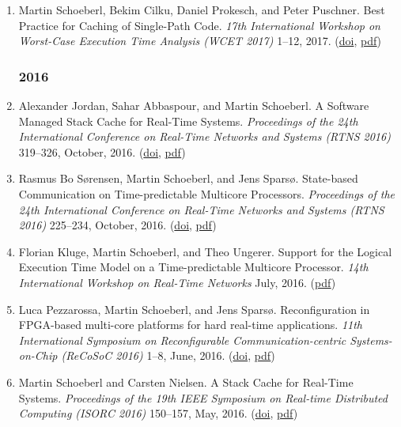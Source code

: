 \begin{enumerate}
\item Martin Schoeberl, Bekim Cilku, Daniel Prokesch, and Peter Puschner.
 Best Practice for Caching of Single-Path Code.
 \emph{17th International Workshop on Worst-Case Execution Time Analysis (WCET 2017)} 1--12, 2017.
(\href{http://dx.doi.org/10.4230/OASIcs.WCET.2017.2}{doi}, \href{http://www.jopdesign.com/doc/spcaching.pdf}{pdf})


\subsubsection*{2016}

\item Alexander Jordan, Sahar Abbaspour, and Martin Schoeberl.
 A Software Managed Stack Cache for Real-Time Systems.
 \emph{Proceedings of the 24th International Conference on Real-Time Networks and Systems (RTNS 2016)} 319--326, October, 2016.
(\href{http://dx.doi.org/10.1145/2997465}{doi}, \href{http://www.jopdesign.com/doc/swscache.pdf}{pdf})

\item Rasmus Bo S{\o}rensen, Martin Schoeberl, and Jens Spars{\o}.
 State-based Communication on Time-predictable Multicore Processors.
 \emph{Proceedings of the 24th International Conference on Real-Time Networks and Systems (RTNS 2016)} 225--234, October, 2016.
(\href{http://dx.doi.org/10.1145/2997465}{doi}, \href{http://www.jopdesign.com/doc/state-com.pdf}{pdf})

\item Florian Kluge, Martin Schoeberl, and Theo Ungerer.
 Support for the Logical Execution Time Model on a Time-predictable Multicore Processor.
 \emph{14th International Workshop on Real-Time Networks} July, 2016.
(\href{http://www.jopdesign.com/doc/mossca-pat.pdf}{pdf})

\item Luca Pezzarossa, Martin Schoeberl, and Jens Spars{\o}.
 Reconfiguration in FPGA-based multi-core platforms for hard real-time applications.
 \emph{11th International Symposium on Reconfigurable Communication-centric Systems-on-Chip (ReCoSoC 2016)} 1--8, June, 2016.
(\href{http://dx.doi.org/10.1109/ReCoSoC.2016.7533895}{doi}, \href{http://www.jopdesign.com/doc/recon-mc.pdf}{pdf})

\item Martin Schoeberl and Carsten Nielsen.
 A Stack Cache for Real-Time Systems.
 \emph{Proceedings of the 19th IEEE Symposium on Real-time Distributed Computing (ISORC 2016)} 150--157, May, 2016.
(\href{http://dx.doi.org/10.1109/ISORC.2016.29}{doi}, \href{http://www.jopdesign.com/doc/stkcache.pdf}{pdf})


\end{enumerate}
